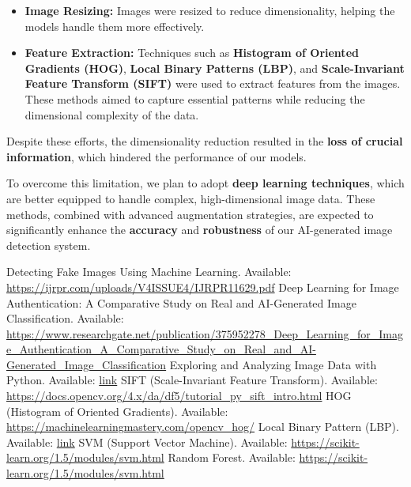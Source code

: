 \documentclass[10pt,twocolumn,letterpaper]{article}
\begin{document}
\begin{itemize}
    \item \textbf{Image Resizing:} Images were resized to reduce dimensionality, helping the models handle them more effectively.
    \item \textbf{Feature Extraction:} Techniques such as \textbf{Histogram of Oriented Gradients (HOG)}, \textbf{Local Binary Patterns (LBP)}, and \textbf{Scale-Invariant Feature Transform (SIFT)} were used to extract features from the images. These methods aimed to capture essential patterns while reducing the dimensional complexity of the data.
\end{itemize}

Despite these efforts, the dimensionality reduction resulted in the \textbf{loss of crucial information}, which hindered the performance of our models.

To overcome this limitation, we plan to adopt \textbf{deep learning techniques}, which are better equipped to handle complex, high-dimensional image data. These methods, combined with advanced augmentation strategies, are expected to significantly enhance the \textbf{accuracy} and \textbf{robustness} of our AI-generated image detection system.

\begin{thebibliography}{6}
     Detecting Fake Images Using Machine Learning. Available: \url{https://ijrpr.com/uploads/V4ISSUE4/IJRPR11629.pdf}
     Deep Learning for Image Authentication: A Comparative Study on Real and AI-Generated Image Classification. Available: \url{https://www.researchgate.net/publication/375952278_Deep_Learning_for_Image_Authentication_A_Comparative_Study_on_Real_and_AI-Generated_Image_Classification}
     Exploring and Analyzing Image Data with Python. Available: \href{https://medium.com/@sehjadkhoja0/title-exploring-and-analyzing-image-data-with-python-79a7f72f4d2b}{link}
     SIFT (Scale-Invariant Feature Transform). Available: \url{https://docs.opencv.org/4.x/da/df5/tutorial_py_sift_intro.html}
     HOG (Histogram of Oriented Gradients). Available: \url{https://machinelearningmastery.com/opencv_hog/}
     Local Binary Pattern (LBP). Available: \href{https://aihalapathirana.medium.com/understanding-the-local-binary-pattern-lbp-a-powerful-method-for-texture-analysis-in-computer-4fb55b3ed8b8}{link}
     SVM (Support Vector Machine). Available: \url{https://scikit-learn.org/1.5/modules/svm.html}
     Random Forest. Available: \url{https://scikit-learn.org/1.5/modules/svm.html}
\end{thebibliography}
    
\end{document}
